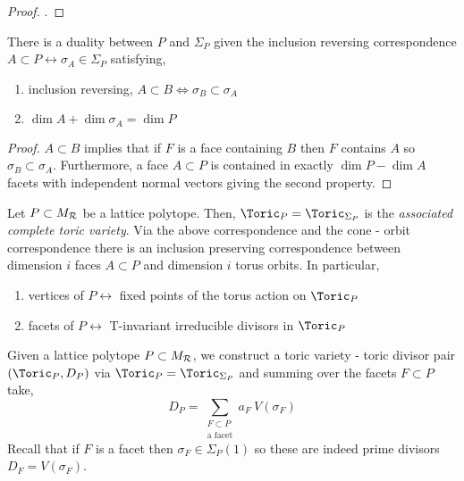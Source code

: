 \begin{proof}
\cite[Thm. 2.3.2]{cox}.
\end{proof}

\begin{proposition}
There is a duality between $P$ and $\Sigma_P$ given the inclusion reversing correspondence $A \subset P \leftrightarrow \sigma_A \in \Sigma_P$ satisfying,
\begin{enumerate}
\item inclusion reversing, $A \subset B \iff \sigma_B \subset \sigma_A$
\item $\dim{A} + \dim{\sigma_A} = \dim{P}$
\end{enumerate}
\end{proposition}

\begin{proof}
$A \subset B$ implies that if $F$ is a face containing $B$ then $F$ contains $A$ so $\sigma_B \subset \sigma_A$. Furthermore, a face $A \subset P$ is contained in exactly $\dim{P} - \dim{A}$ facets with independent normal vectors giving the second property. 
\end{proof}

\begin{definition}
Let $P \subset M_{\mathcal{R}}$ be a lattice polytope. Then, $\Toric_P = \Toric_{\Sigma_P}$ is the \textit{associated complete toric variety}. Via the above correspondence and the cone - orbit correspondence there is an inclusion preserving correspondence between dimension $i$ faces $A \subset P$ and dimension $i$ torus orbits. In particular,
\begin{enumerate}
\item vertices of $P \leftrightarrow$ fixed points of the torus action on $\Toric_P$
\item facets of $P \leftrightarrow$ T-invariant irreducible divisors in $\Toric_P$
\end{enumerate}
\end{definition}

\begin{definition}
Given a lattice polytope $P \subset M_{\mathcal{R}}$, we construct a toric variety - toric divisor pair $(\Toric_P, D_P)$ via $\Toric_P = \Toric_{\Sigma_P}$ and summing over the facets $F \subset P$ take,
\[ D_P = \sum_{\substack{F \subset P \\ \text{a facet}}} a_F \: V(\sigma_F) \]
Recall that if $F$ is a facet then $\sigma_F \in \Sigma_P(1)$ so these are indeed prime divisors $D_F = V(\sigma_F)$.
\end{definition}


